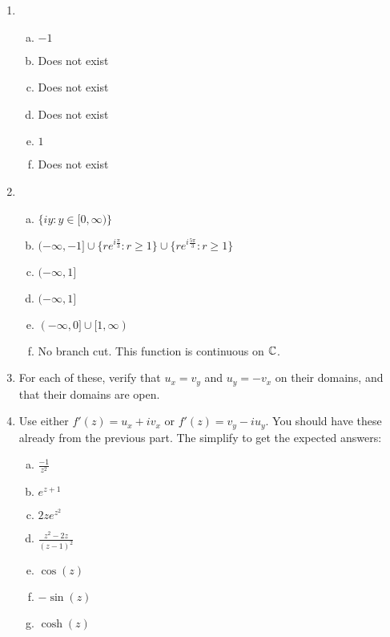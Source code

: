 \begin{enumerate}

\item \begin{enumerate}[a)]
	\item $-1$
	\item Does not exist
	\item Does not exist
	\item Does not exist
	\item $1$
	\item Does not exist
\end{enumerate}

\item \begin{enumerate}[a)]
	\item $\{iy: y\in [0,\infty)\}$
	\item $(-\infty,-1] \cup \{re^{i\frac{\pi}{3}}: r\ge 1\} \cup \{re^{i\frac{5\pi}{3}}: r\ge 1\}$
	\item $(-\infty,1]$
	\item $(-\infty,1]$
	\item $(-\infty,0] \cup [1,\infty)$
	\item No branch cut. This function is continuous on $\mathbb{C}$.
\end{enumerate}

\item For each of these, verify that $u_x = v_y$ and $u_y = -v_x$ on their domains, and that their domains are open.

\item Use either $f'(z) = u_x + iv_x$ or $f'(z) = v_y - iu_y$. You should have these already from the previous part. The simplify to get the expected answers:

\begin{enumerate}[a)]
	\item $\frac{-1}{z^2}$
	\item $e^{z+1}$
	\item $2ze^{z^2}$
	\item $\frac{z^2-2z}{(z-1)^2}$
	\item $\cos(z)$
	\item $-\sin(z)$
	\item $\cosh(z)$
\end{enumerate}


\end{enumerate}
